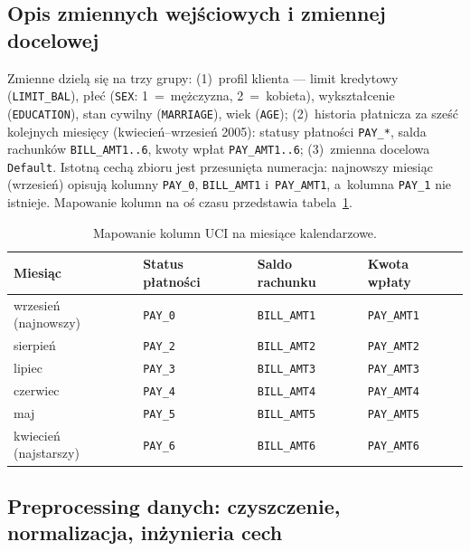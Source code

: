 \subsection{Opis zmiennych wejściowych i zmiennej docelowej}

Zmienne dzielą się na trzy grupy: (1)~profil klienta --- limit kredytowy
(\texttt{LIMIT\_BAL}), płeć (\texttt{SEX}: 1~=~mężczyzna, 2~=~kobieta),
wykształcenie (\texttt{EDUCATION}), stan cywilny (\texttt{MARRIAGE}), wiek
(\texttt{AGE}); (2)~historia płatnicza za sześć kolejnych miesięcy
(kwiecień--wrzesień 2005): statusy płatności \texttt{PAY\_*}, salda rachunków
\texttt{BILL\_AMT1..6}, kwoty wpłat \texttt{PAY\_AMT1..6}; (3)~zmienna docelowa
\texttt{Default}. Istotną cechą zbioru jest przesunięta numeracja: najnowszy
miesiąc (wrzesień) opisują kolumny \texttt{PAY\_0}, \texttt{BILL\_AMT1}
i~\texttt{PAY\_AMT1}, a~kolumna \texttt{PAY\_1} nie istnieje. Mapowanie kolumn
na oś czasu przedstawia tabela~\ref{tab:mapowanie-kolumn}.

\begin{table}[htbp]
\centering
\caption{Mapowanie kolumn UCI na miesiące kalendarzowe.}
\label{tab:mapowanie-kolumn}
\begin{tabular}{llll}
\toprule
Miesiąc & Status płatności & Saldo rachunku & Kwota wpłaty \\
\midrule
wrzesień (najnowszy) & \texttt{PAY\_0} & \texttt{BILL\_AMT1} & \texttt{PAY\_AMT1} \\
sierpień             & \texttt{PAY\_2} & \texttt{BILL\_AMT2} & \texttt{PAY\_AMT2} \\
lipiec               & \texttt{PAY\_3} & \texttt{BILL\_AMT3} & \texttt{PAY\_AMT3} \\
czerwiec             & \texttt{PAY\_4} & \texttt{BILL\_AMT4} & \texttt{PAY\_AMT4} \\
maj                  & \texttt{PAY\_5} & \texttt{BILL\_AMT5} & \texttt{PAY\_AMT5} \\
kwiecień (najstarszy)& \texttt{PAY\_6} & \texttt{BILL\_AMT6} & \texttt{PAY\_AMT6} \\
\bottomrule
\end{tabular}
\end{table}

\subsection{Preprocessing danych: czyszczenie, normalizacja, inżynieria cech}

